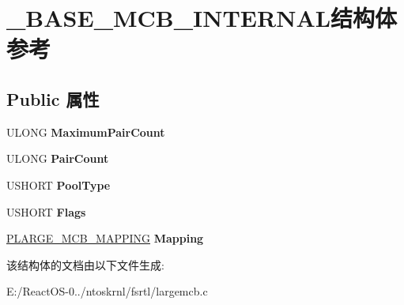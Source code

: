 \hypertarget{struct___b_a_s_e___m_c_b___i_n_t_e_r_n_a_l}{}\section{\+\_\+\+B\+A\+S\+E\+\_\+\+M\+C\+B\+\_\+\+I\+N\+T\+E\+R\+N\+A\+L结构体 参考}
\label{struct___b_a_s_e___m_c_b___i_n_t_e_r_n_a_l}
\subsection*{Public 属性}
\begin{DoxyCompactItemize}
\item 
\mbox{\label{struct___b_a_s_e___m_c_b___i_n_t_e_r_n_a_l_a066db4046ec37557dc067e29977fa174}} 
U\+L\+O\+NG {\bfseries Maximum\+Pair\+Count}
\item 
\mbox{\label{struct___b_a_s_e___m_c_b___i_n_t_e_r_n_a_l_a9c1778a30ffa68b675036a6cb6a9b181}} 
U\+L\+O\+NG {\bfseries Pair\+Count}
\item 
\mbox{\label{struct___b_a_s_e___m_c_b___i_n_t_e_r_n_a_l_a3a05a29b91acf22b51be420edcb7ff99}} 
U\+S\+H\+O\+RT {\bfseries Pool\+Type}
\item 
\mbox{\label{struct___b_a_s_e___m_c_b___i_n_t_e_r_n_a_l_abda24ccf4587e5ab0e883ec73dc9a7da}} 
U\+S\+H\+O\+RT {\bfseries Flags}
\item 
\mbox{\label{struct___b_a_s_e___m_c_b___i_n_t_e_r_n_a_l_a2d37f3f935f55a53c6b40f3809213fc7}} 
\hyperlink{struct___l_a_r_g_e___m_c_b___m_a_p_p_i_n_g}{P\+L\+A\+R\+G\+E\+\_\+\+M\+C\+B\+\_\+\+M\+A\+P\+P\+I\+NG} {\bfseries Mapping}
\end{DoxyCompactItemize}


该结构体的文档由以下文件生成\+:\begin{DoxyCompactItemize}
\item 
E\+:/\+React\+O\+S-\/0../ntoskrnl/fsrtl/largemcb.\+c\end{DoxyCompactItemize}
